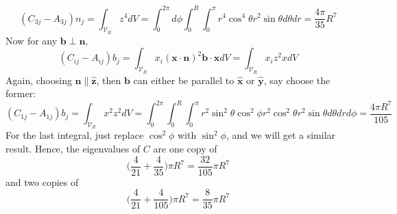 \documentclass[a4paper]{article}
\begin{document}
\begin{ans}
\begin{enumerate}[label=(\roman*)]
$$(C_{3j}-A_{3j})n_j=\int_{\mathcal{V}_R}z^4dV=\int_0^{2\pi}d\phi\int_0^R\int_0^\pi r^4\cos^4\theta r^2\sin\theta d\theta dr=\frac{4\pi}{35}R^7$$
Now for any $\mathbf{b}\perp\mathbf{n}$,
$$(C_{ij}-A_{ij})b_j=\int_{\mathcal{V}_R}x_i(\mathbf{x}\cdot\mathbf{n})^2\mathbf{b}\cdot\mathbf{x}dV=\int_{\mathcal{V}_R}x_iz^2xdV$$
Again, choosing $\mathbf{n}\parallel\mathbf{\hat{z}}$, then $\mathbf{b}$ can either be parallel to $\mathbf{\hat{x}}$ or $\mathbf{\hat{y}}$, say choose the former:
$$(C_{1j}-A_{1j})b_j=\int_{\mathcal{V}_R}x^2z^2dV=\int_0^{2\pi}\int_0^R\int_0^\pi r^2\sin^2\theta\cos^2\phi r^2\cos^2\theta r^2\sin\theta d\theta dr d\phi=\frac{4\pi R^7}{105}$$
For the last integral, just replace $\cos^2\phi$ with $\sin^2\phi$, and we will get a similar result. Hence, the eigenvalues of $C$ are one copy of $$\bigg(\frac{4}{21}+\frac{4}{35}\bigg)\pi R^7=\frac{32}{105}\pi R^7$$
and two copies of $$\bigg(\frac{4}{21}+\frac{4}{105}\bigg)\pi R^7=\frac{8}{35}\pi R^7$$
\end{enumerate}
\end{ans}
\newpage
\end{document}

